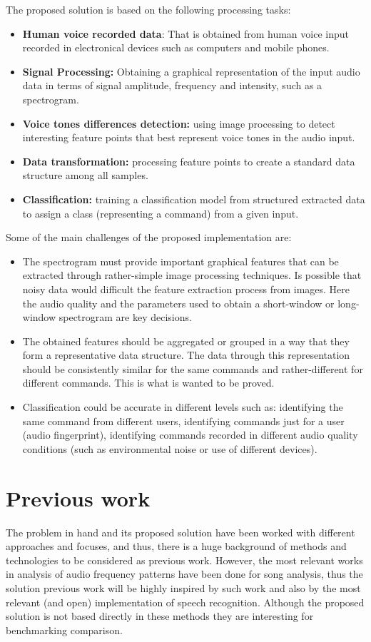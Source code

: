 \documentclass[anon]{CI}
\begin{document}
The proposed solution is based on the following processing tasks:

\begin{itemize}
\item \textbf{Human voice recorded data}: That is obtained from human voice input recorded in electronical devices such as computers and mobile phones. 
\item \textbf{Signal Processing: }Obtaining a graphical representation of the input audio data in terms of signal amplitude, frequency and intensity, such as a spectrogram.
\item \textbf{Voice tones differences detection: }using image processing to detect interesting feature points that best represent voice tones in the audio input.
\item \textbf{Data transformation: }processing feature points to create a standard data structure among all samples.
\item \textbf{Classification: }training a classification model from structured extracted data to assign a class (representing a command) from a given input.
\end{itemize}

Some of the main challenges of the proposed implementation are:
\begin{itemize}
	\item The spectrogram must provide important graphical features that can be extracted through rather-simple image processing techniques. Is possible that noisy data would difficult the feature extraction process from images. Here the audio quality and the parameters used to obtain a short-window or long-window spectrogram are key decisions.
	\item The obtained features should be aggregated or grouped in a way that they form a representative data structure. The data through this representation should be consistently similar for the same commands and rather-different for different commands. This is what is wanted to be proved.
	\item Classification could be accurate in different levels such as: identifying the same command from different users, identifying commands just for a user (audio fingerprint), identifying commands recorded in different audio quality conditions (such as environmental noise or use of different devices).
\end{itemize}

\section{Previous work}
The problem in hand and its proposed solution have been worked with different approaches and focuses, and thus, there is a huge background of methods and technologies to be considered as previous work. However, the most relevant works in analysis of audio frequency patterns have been done for song analysis, thus the solution previous work will be highly inspired by such work and also by the most relevant (and open)  implementation of speech recognition. Although the proposed solution is not based directly in these methods they are interesting for benchmarking comparison.
\end{document}
